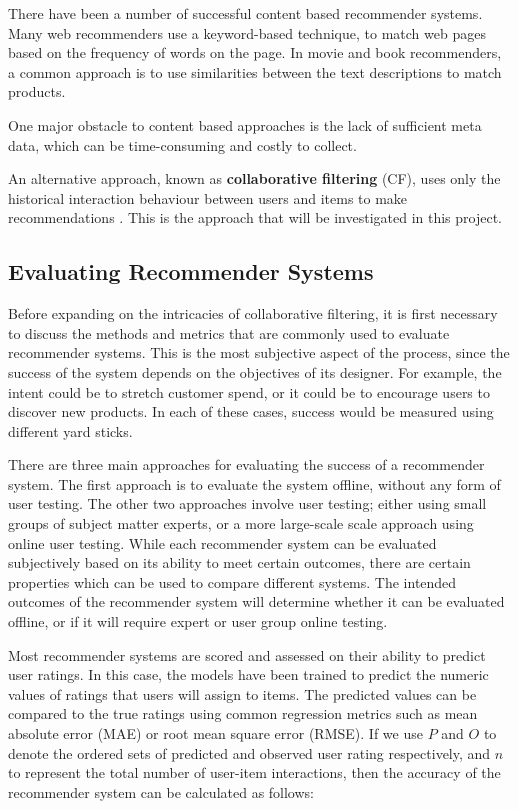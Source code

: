There have been a number of successful content based recommender systems. Many web recommenders use a keyword-based technique, to match web pages based on the frequency of words on the page. In movie and book recommenders, a common approach is to use similarities between the text descriptions to match products. \parencite{handbook_1.3_content-based}

One major obstacle to content based approaches is the lack of sufficient meta data, which can be time-consuming and costly to collect. \parencite{cf_1.6_implicit}

An alternative approach, known as \textbf{collaborative filtering} (CF), uses only the historical interaction behaviour between users and items to make recommendations \parencite{cf_1.1}. This is the approach that will be investigated in this project.

\subsection{Evaluating Recommender Systems}
Before expanding on the intricacies of collaborative filtering, it is first necessary to discuss the methods and metrics that are commonly used to evaluate recommender systems. This is the most subjective aspect of the process, since the success of the system depends on the objectives of its designer. For example, the intent could be to stretch customer spend, or it could be to encourage users to discover new products. In each of these cases, success would be measured using different yard sticks. \parencite{eval_colab}

There are three main approaches for evaluating the success of a recommender system. The first approach is to evaluate the system offline, without any form of user testing. The other two approaches involve user testing; either using small groups of subject matter experts, or a more large-scale scale approach using online user testing. While each recommender system can be evaluated subjectively based on its ability to meet certain outcomes, there are certain properties which can be used to compare different systems. \parencite{handbook_1.8_evaluation} The intended outcomes of the recommender system will determine whether it can be evaluated offline, or if it will require expert or user group online testing.

Most recommender systems are scored and assessed on their ability to predict user ratings. In this case, the models have been trained to predict the numeric values of ratings that users will assign to items. The predicted values can be compared to the true ratings using common regression metrics such as mean absolute error (MAE) or root mean square error (RMSE). \parencite{eval_coverage} If we use $P$ and $O$ to denote the ordered sets of predicted and observed user rating respectively, and $n$ to represent the total number of user-item interactions, then the accuracy of the recommender system can be calculated as follows:

